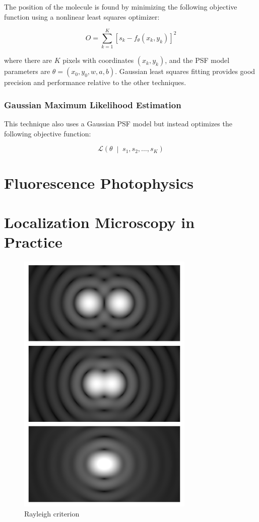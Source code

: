 \documentclass[10pt,a4paper]{book}
\newcommand{\given}{\;\middle|\;}
\begin{document}
The position of the molecule is found by minimizing the following objective function using a nonlinear least squares optimizer:

\begin{equation}
    O = \sum_{k=1}^K \left[ s_k - f_{\theta} \left(x_k, y_k\right)\right]^2
\end{equation}

\noindent where there are $K$ pixels with coordinates $\left( x_k, y_k\right)$, and the PSF model parameters are $\theta = \left( x_0, y_0, w, a, b \right)$. Gaussian least squares fitting provides good precision and performance relative to the other techniques.

\subsection{Gaussian Maximum Likelihood Estimation}

This technique also uses a Gaussian PSF model but instead optimizes the following objective function:

\begin{equation}
    \mathcal{L} \left(\theta \given s_1, s_2, \ldots, s_K \right)
\end{equation}

\chapter{Fluorescence Photophysics}

\chapter{Localization Microscopy in Practice}

\begin{figure}[ht]
    \centering
    \includegraphics[width=0.75\textwidth]{Airy_disk_spacing_near_Rayleigh_criterion.png}
    \caption{Rayleigh criterion}
    \label{fig:rayleigh}
\end{figure}
\end{document}
